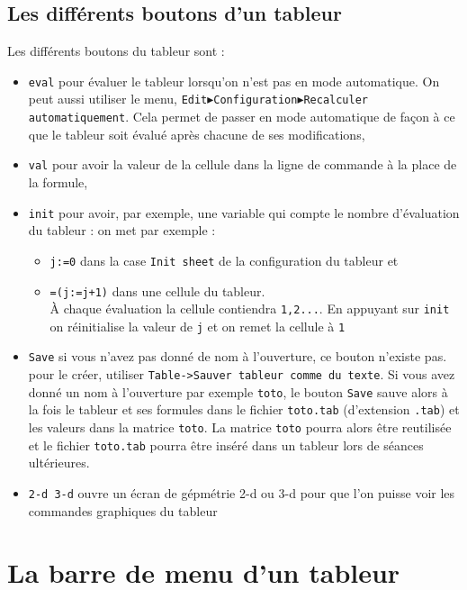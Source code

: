 \documentclass[a4paper,11pt]{book}
\begin{document}
\subsection{Les diff\'erents boutons d'un tableur}\label{sec:sauver}
Les diff\'erents boutons du tableur sont :
\begin{itemize}
\item{\tt eval} pour \'evaluer le tableur lorsqu'on n'est pas en mode 
automatique. On peut aussi utiliser le menu, 
{\tt Edit$\blacktriangleright$Configuration$\blacktriangleright$Recalculer automatiquement}. Cela permet de passer en  mode automatique de fa\c{c}on \`a ce que
le tableur soit \'evalu\'e apr\`es chacune de ses modifications,
\item{\tt val} pour avoir la valeur de la cellule dans la ligne de commande
\`a la place de la formule,
\item{\tt init} pour avoir, par exemple, une variable qui compte le nombre 
d'\'evaluation du tableur : on met par exemple :
\begin{itemize}
\item{\tt j:=0} dans la case {\tt Init sheet} de la configuration du tableur et
\item{\tt =(j:=j+1)} dans une cellule du tableur.\\
\`A chaque \'evaluation la cellule contiendra {\tt 1,2...}. En appuyant sur 
{\tt init} on r\'einitialise la valeur de {\tt j} et on remet  la cellule \`a 
{\tt 1} 
\end{itemize}
\item{\tt Save} si vous n'avez pas donn\'e de nom \`a l'ouverture, ce bouton 
n'existe pas. pour le cr\'eer, utiliser 
{\tt Table->Sauver tableur comme du texte}. Si vous avez donn\'e un  nom \`a 
l'ouverture par exemple {\tt toto}, le bouton {\tt Save} 
sauve alors \`a la fois le tableur et ses formules dans le fichier 
{\tt toto.tab} (d'extension {\tt .tab}) et les valeurs dans la matrice 
{\tt toto}. La matrice {\tt toto} pourra alors \^etre reutilis\'ee et le 
fichier {\tt toto.tab} pourra \^etre ins\'er\'e dans un tableur lors de 
s\'eances ult\'erieures.
\item{\tt 2-d 3-d} ouvre un \'ecran de g\'epm\'etrie 2-d ou 3-d pour que l'on 
puisse voir les commandes graphiques du  tableur
\end{itemize}


\section{La barre de menu d'un tableur}
\end{document}
